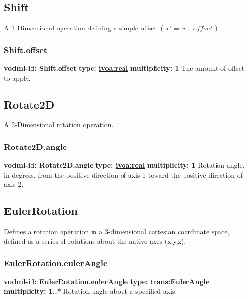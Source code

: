   \subsection{Shift}
  \label{sect:Shift}
    A 1-Dimensional operation defining a simple offset. ( $x' = x + offset$ )

    \subsubsection{Shift.offset}
      \textbf{vodml-id: Shift.offset} \newline
      \textbf{type: \hyperref[sect:ivoa]{ivoa:real}} \newline
      \textbf{multiplicity: 1} \newline 
      The amount of offset to apply.

  \subsection{Rotate2D}
  \label{sect:Rotate2D}
    A 2-Dimensional rotation operation.

    \subsubsection{Rotate2D.angle}
      \textbf{vodml-id: Rotate2D.angle} \newline
      \textbf{type: \hyperref[sect:ivoa]{ivoa:real}} \newline
      \textbf{multiplicity: 1} \newline 
      Rotation angle, in degrees, from the positive direction of axis 1 toward the positive direction of axis 2.

  \subsection{EulerRotation}
  \label{sect:EulerRotation}
    Defines a rotation operation in a 3-dimensional cartesian coordinate space, defined as a series of rotations about the native axes (x,y,z).

    \subsubsection{EulerRotation.eulerAngle}
      \textbf{vodml-id: EulerRotation.eulerAngle} \newline
      \textbf{type: \hyperref[sect:EulerAngle]{trans:EulerAngle}} \newline
      \textbf{multiplicity: 1..*} \newline 
      Rotation angle about a specified axis.

